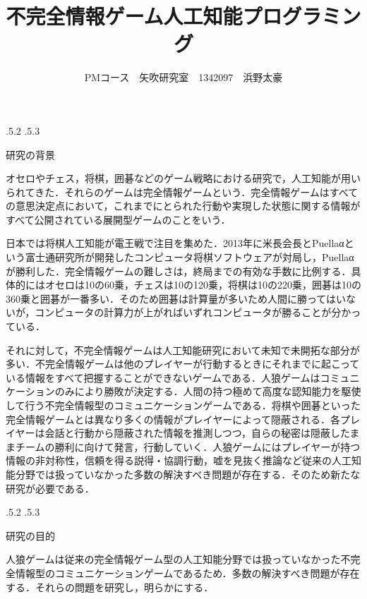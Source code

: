\documentclass[uplatex]{jsarticle}
\title{\vspace{-14mm}不完全情報ゲーム人工知能プログラミング}
\author{PMコース　矢吹研究室　1342097　浜野太豪}
\date{}%
\makeatletter
\renewcommand{\section}{%
    \if@slide\clearpage\fi
    \@startsection{section}{1}{\z@}%
    {\Cvs \@plus.5\Cdp \@minus.2\Cdp}%
    {.5\Cvs \@plus.3\Cdp}%
    {\normalfont\raggedright}}
\makeatother
\begin{document}
\maketitle





\section{研究の背景}

オセロやチェス，将棋，囲碁などのゲーム戦略における研究で，人工知能が用いられてきた．それらのゲームは完全情報ゲームという．完全情報ゲームはすべての意思決定点において，これまでにとられた行動や実現した状態に関する情報がすべて公開されている展開型ゲームのことをいう．\cite{okumura2013}

日本では将棋人工知能が電王戦で注目を集めた．2013年に米長会長とPuellaαという富士通研究所が開発したコンピュータ将棋ソフトウェアが対局し，Puellaαが勝利した．完全情報ゲームの難しさは，終局までの有効な手数に比例する．具体的にはオセロは10の60乗，チェスは10の120乗，将棋は10の220乗，囲碁は10の360乗と囲碁が一番多い．\cite{jinro2}そのため囲碁は計算量が多いため人間に勝ってはいないが，コンピュータの計算力が上がればいずれコンピュータが勝ることが分かっている．

それに対して，不完全情報ゲームは人工知能研究において未知で未開拓な部分が多い．不完全情報ゲームは他のプレイヤーが行動するときにそれまでに起こっている情報をすべて把握することができないゲームである．\cite{wiki2}人狼ゲームはコミュニケーションのみにより勝敗が決定する．人間の持つ極めて高度な認知能力を駆使して行う不完全情報型のコミュニケーションゲームである．将棋や囲碁といった完全情報ゲームとは異なり多くの情報がプレイヤーによって隠蔽される．各プレイヤーは会話と行動から隠蔽された情報を推測しつつ，自らの秘密は隠蔽したままチームの勝利に向けて発言，行動していく．人狼ゲームにはプレイヤーが持つ情報の非対称性，信頼を得る説得・協調行動，嘘を見抜く推論など従来の人工知能分野では扱っていなかった多数の解決すべき問題が存在する．\cite{jinro1}そのため新たな研究が必要である．


\section{研究の目的}

人狼ゲームは従来の完全情報ゲーム型の人工知能分野では扱っていなかった不完全情報型のコミュニケーションゲームであるため．多数の解決すべき問題が存在する．それらの問題を研究し，明らかにする．
\end{document}
